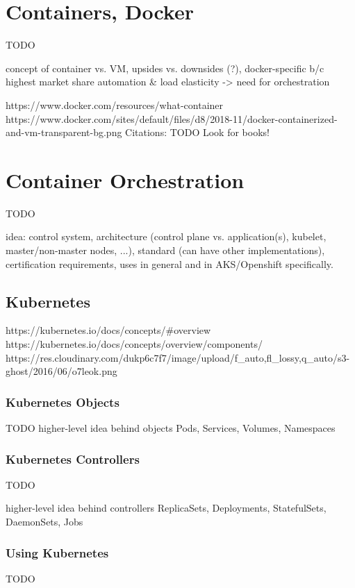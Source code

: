\section{Containers, Docker}
TODO

concept of container vs. VM, upsides vs. downsides (?), docker-specific b/c highest market share
automation \& load elasticity -> need for orchestration

https://www.docker.com/resources/what-container\\
https://www.docker.com/sites/default/files/d8/2018-11/docker-containerized-and-vm-transparent-bg.png
Citations: TODO Look for books! 

\section{Container Orchestration}
TODO

idea: control system, architecture (control plane vs. application(s), kubelet, master/non-master nodes, ...), standard (can have other implementations), certification requirements, uses in general and in AKS/Openshift specifically.

\subsection{Kubernetes}

https://kubernetes.io/docs/concepts/\#overview \\
https://kubernetes.io/docs/concepts/overview/components/ \\
https://res.cloudinary.com/dukp6c7f7/image/upload/f\_auto,fl\_lossy,q\_auto/s3-ghost/2016/06/o7leok.png \\

\subsubsection{Kubernetes Objects}
TODO
higher-level idea behind objects
Pods, Services, Volumes, Namespaces

\subsubsection{Kubernetes Controllers}
TODO

higher-level idea behind controllers
ReplicaSets, Deployments, StatefulSets, DaemonSets, Jobs

\subsubsection{Using Kubernetes}
TODO

